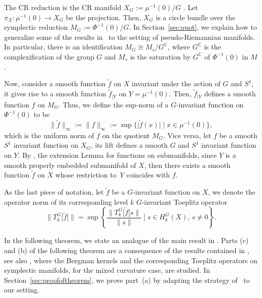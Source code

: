 \documentclass[10pt,a4paper]{amsart}
\numberwithin{equation}{section}
\begin{document}
	 The CR reduction is the CR manifold $X_G:=\mu^{-1}(0)/G$ \cite{hsiaohuang}. Let $\pi_X \colon \mu^{-1}(0) \rightarrow X_G$ be the projection. Then, $X_G$ is a circle bundle over the symplectic reduction $M_G:=\Phi^{-1}(0)/G$. In Section~\ref{sec:quot}, we explain how to generalize some of the results in~\cite{gs} to the setting of pseudo-Riemannian manifolds. In particular, there is an identification
	 $ M_G\cong M_s/G^{\mathbb{C}}$,
	 where $G^{\mathbb{C}}$ is the complexification of the group $G$ and $M_s$ is the saturation by $G^{\mathbb{C}}$ of $\Phi^{-1}(0)$ in $M$.
	
	 Now, consider a smooth function $\widetilde{f}$ on $X$ invariant under the action of $G$ and $S^1$, it gives rise to a smooth function $\widetilde{f}_{\vert Y}$ on $Y=\mu^{-1}(0)$. Then, $\widetilde{f}_{\vert Y}$ defines a smooth function $f$ on $M_G$. Thus, we define the sup-norm of a $G$-invariant function on $\Phi^{-1}(0)$ to be
	 \[%
	 	\big\lVert \widetilde{f}\big\rVert_{\infty} :=\lVert f\rVert_{\infty} := \sup\big\{ \big\lvert \widetilde f(x)\big\rvert \mid x \in \mu^{-1}(0)\big\},
	 \]
	 which is the uniform norm of $f$ on the quotient $M_G$. Vice versa, let $f$ be a smooth $S^1$ invariant function on $X_G$, its lift defines a smooth $G$ and $S^1$ invariant function on $Y$. By \cite[Lemma~5.34\,(b)]{lee}, the extension Lemma for functions on submanifolds, since $Y$ is a smooth properly embedded submanifold of $X$, then there exists a smooth function $\widetilde{f}$ on $X$ whose restriction to~$Y$ coincides with $f$.
	
	 As the last piece of notation, let $\widetilde{f}$ be a $G$-invariant function on $X$, we denote the operator norm of its corresponding level $k$ $G$-invariant Toeplitz operator
	 \begin{equation} \label{eq:opn}\big\lVert T^{G}_{k}\big[\widetilde{f}\big] \big\rVert=\sup \left\{\frac{\lVert T^G_k\big[\widetilde{f}\big]s\rVert}{\lVert s\rVert} \mid s\in H^{G}_k(X) ,\, s\neq 0\right\} .
	 \end{equation}
	
	 In the following theorem, we state an analogue of the main result in \cite{bms}. Parts (c) and (b) of the following theorem are a consequence of the results contained in \cite{gh}, see also \cite{mm,mmt}, where the Bergman kernels and the corresponding Toeplitz operators on symplectic manifolds, for the mixed curvature case, are studied. In Section~\ref{sec:proofoftheorem}, we prove part~(a) by adapting the strategy of~\cite{schl2} to our setting.
	
\end{document}
